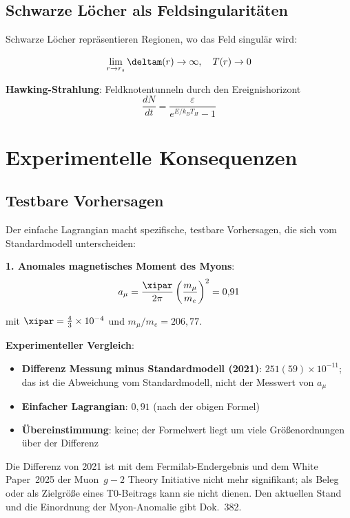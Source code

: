 	\subsection{Schwarze Löcher als Feldsingularitäten}
	
	Schwarze Löcher repräsentieren Regionen, wo das Feld singulär wird:
	
	\begin{equation}
		\lim_{r \to r_s} \deltam(r) \to \infty, \quad T(r) \to 0
	\end{equation}
	
	\textbf{Hawking-Strahlung}: Feldknotentunneln durch den Ereignishorizont
	\begin{equation}
		\frac{dN}{dt} = \frac{\varepsilon}{e^{E/k_B T_H} - 1}
	\end{equation}
	
	\section{Experimentelle Konsequenzen}
	
	\subsection{Testbare Vorhersagen}
	
	Der einfache Lagrangian macht spezifische, testbare Vorhersagen, die sich vom Standardmodell unterscheiden:
	
	\textbf{1. Anomales magnetisches Moment des Myons}:
	\begin{equation}
		a_{\mu} = \frac{\xipar}{2\pi} \left(\frac{m_{\mu}}{m_e}\right)^2 = 0{,}91
	\end{equation}
	
	mit $\xipar = \tfrac{4}{3}\times10^{-4}$ und $m_\mu/m_e = 206{,}77$.
	
	\textbf{Experimenteller Vergleich}:
	\begin{itemize}
		\item \textbf{Differenz Messung minus Standardmodell (2021)}: $251(59) \times 10^{-11}$; das ist die Abweichung vom Standardmodell, nicht der Messwert von $a_\mu$
		\item \textbf{Einfacher Lagrangian}: $0{,}91$ (nach der obigen Formel)
		\item \textbf{Übereinstimmung}: keine; der Formelwert liegt um viele Größenordnungen über der Differenz
	\end{itemize}
	
	Die Differenz von 2021 ist mit dem Fermilab-Endergebnis und dem White Paper~2025 der Muon~$g-2$ Theory Initiative nicht mehr signifikant; als Beleg oder als Zielgröße eines T0-Beitrags kann sie nicht dienen. Den aktuellen Stand und die Einordnung der Myon-Anomalie gibt Dok.~382.
	
